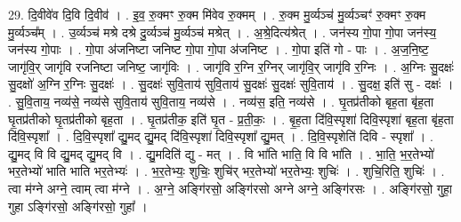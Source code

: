 \documentclass[17pt]{extarticle}
\begin{document}
29. दि॒वीवे॑व दि॒वि दि॒वीव॑ । . इ॒व॒ रु॒क्मꣳ रु॒क्म मि॑वेव रु॒क्मम् । . रु॒क्म मु॒र्व्यञ्च॑ मु॒र्व्यञ्चꣳ॑ रु॒क्मꣳ रु॒क्म मु॒र्व्यञ्च᳚म् । . उ॒र्व्यञ्च॑ मश्रे दश्रे दु॒र्व्यञ्च॑ मु॒र्व्यञ्च॑ मश्रेत् । . अ॒श्रे॒दित्य॑श्रेत् । . जन॑स्य गो॒पा गो॒पा जन॑स्य॒ जन॑स्य गो॒पाः । . गो॒पा अ॑जनिष्टा जनिष्ट गो॒पा गो॒पा अ॑जनिष्ट । . गो॒पा इति॑ गो - पाः । . अ॒ज॒नि॒ष्ट॒ जागृ॑वि॒र् जागृ॑वि रजनिष्टा जनिष्ट॒ जागृ॑विः । . जागृ॑वि र॒ग्नि र॒ग्निर् जागृ॑वि॒र् जागृ॑वि र॒ग्निः । . अ॒ग्निः सु॒दक्षः॑ सु॒दक्षो॑ अ॒ग्नि र॒ग्निः सु॒दक्षः॑ । . सु॒दक्षः॑ सुवि॒ताय॑ सुवि॒ताय॑ सु॒दक्षः॑ सु॒दक्षः॑ सुवि॒ताय॑ । . सु॒दक्ष॒ इति॑ सु - दक्षः॑ । . सु॒वि॒ताय॒ नव्य॑से॒ नव्य॑से सुवि॒ताय॑ सुवि॒ताय॒ नव्य॑से । . नव्य॑स॒ इति॒ नव्य॑से । . घृ॒तप्र॑तीको बृह॒ता बृ॑ह॒ता घृ॒तप्र॑तीको घृ॒तप्र॑तीको बृह॒ता । . घृ॒तप्र॑तीक॒ इति॑ घृ॒त - प्र॒ती॒कः॒ । . बृ॒ह॒ता दि॑वि॒स्पृशा॑ दिवि॒स्पृशा॑ बृह॒ता बृ॑ह॒ता दि॑वि॒स्पृशा᳚ । . दि॒वि॒स्पृशा᳚ द्यु॒मद् द्यु॒मद् दि॑वि॒स्पृशा॑ दिवि॒स्पृशा᳚ द्यु॒मत् । . दि॒वि॒स्पृशेति॑ दिवि - स्पृशा᳚ । . द्यु॒मद् वि वि द्यु॒मद् द्यु॒मद् वि । . द्यु॒मदिति॑ द्यु - मत् । . वि भा॑ति भाति॒ वि वि भा॑ति । . भा॒ति॒ भ॒र॒तेभ्यो॑ भर॒तेभ्यो॑ भाति भाति भर॒तेभ्यः॑ । . भ॒र॒तेभ्यः॒ शुचिः॒ शुचि॑र् भर॒तेभ्यो॑ भर॒तेभ्यः॒ शुचिः॑ । . शुचि॒रिति॒ शुचिः॑ । . त्वा म॑ग्ने अग्ने॒ त्वाम् त्वा म॑ग्ने । . अ॒ग्ने॒ अङ्गि॑रसो॒ अङ्गि॑रसो अग्ने अग्ने॒ अङ्गि॑रसः । . अङ्गि॑रसो॒ गुहा॒ गुहा ऽङ्गि॑रसो॒ अङ्गि॑रसो॒ गुहा᳚ । \newline
\end{document}
